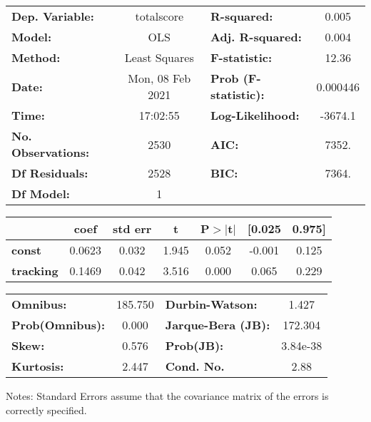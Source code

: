 \begin{center}
\begin{tabular}{lclc}
\toprule
\textbf{Dep. Variable:}    &    totalscore    & \textbf{  R-squared:         } &     0.005   \\
\textbf{Model:}            &       OLS        & \textbf{  Adj. R-squared:    } &     0.004   \\
\textbf{Method:}           &  Least Squares   & \textbf{  F-statistic:       } &     12.36   \\
\textbf{Date:}             & Mon, 08 Feb 2021 & \textbf{  Prob (F-statistic):} &  0.000446   \\
\textbf{Time:}             &     17:02:55     & \textbf{  Log-Likelihood:    } &   -3674.1   \\
\textbf{No. Observations:} &        2530      & \textbf{  AIC:               } &     7352.   \\
\textbf{Df Residuals:}     &        2528      & \textbf{  BIC:               } &     7364.   \\
\textbf{Df Model:}         &           1      & \textbf{                     } &             \\
\bottomrule
\end{tabular}
\begin{tabular}{lcccccc}
                  & \textbf{coef} & \textbf{std err} & \textbf{t} & \textbf{P$> |$t$|$} & \textbf{[0.025} & \textbf{0.975]}  \\
\midrule
\textbf{const}    &       0.0623  &        0.032     &     1.945  &         0.052        &       -0.001    &        0.125     \\
\textbf{tracking} &       0.1469  &        0.042     &     3.516  &         0.000        &        0.065    &        0.229     \\
\bottomrule
\end{tabular}
\begin{tabular}{lclc}
\textbf{Omnibus:}       & 185.750 & \textbf{  Durbin-Watson:     } &    1.427  \\
\textbf{Prob(Omnibus):} &   0.000 & \textbf{  Jarque-Bera (JB):  } &  172.304  \\
\textbf{Skew:}          &   0.576 & \textbf{  Prob(JB):          } & 3.84e-38  \\
\textbf{Kurtosis:}      &   2.447 & \textbf{  Cond. No.          } &     2.88  \\
\bottomrule
\end{tabular}
\end{center}

Notes: \newline
 [1] Standard Errors assume that the covariance matrix of the errors is correctly specified.
